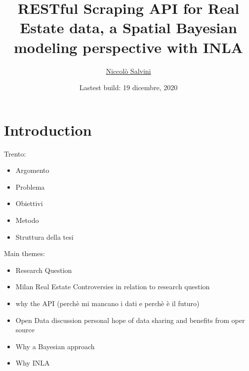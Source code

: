 \documentclass[
  12pt,
  a4paper,
  oneside]{book}
\title{RESTful Scraping API for Real Estate data, a Spatial Bayesian modeling perspective with INLA}
\author{\href{https://niccolosalvini.netlify.app/}{Niccolò Salvini}}
\date{Lastest build: 19 dicembre, 2020}
\providecommand{\tightlist}{%
  \setlength{\itemsep}{0pt}\setlength{\parskip}{0pt}}
\let\oldmaketitle\maketitle
\theoremstyle{definition}
\theoremstyle{definition}
\theoremstyle{definition}
\theoremstyle{remark}
\begin{document}
\maketitle


\newpage

\let\maketitle\oldmaketitle
\maketitle

{
\setcounter{tocdepth}{2}
\tableofcontents
}
\listoftables
\listoffigures
{}
\hypertarget{intro}{%
\chapter{Introduction}\label{intro}}

Trento:

\begin{itemize}
\tightlist
\item
  Argomento
\item
  Problema
\item
  Obiettivi
\item
  Metodo
\item
  Struttura della tesi
\end{itemize}

Main themes:

\begin{itemize}
\tightlist
\item
  Research Question
\item
  Milan Real Estate Controversies in relation to research question
\item
  why the API (perchè mi mancano i dati e perchè è il futuro)
\item
  Open Data discussion personal hope of data sharing and benefits from oper source
\item
  Why a Bayesian approach
\item
  Why INLA
\end{itemize}
\end{document}
